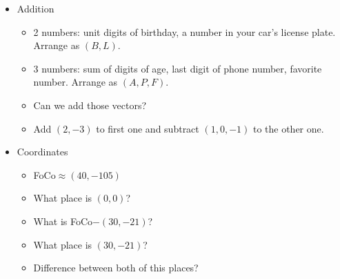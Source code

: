 \documentclass{standalone}
\begin{document}
\begin{itemize}
  \item Addition
  \begin{itemize}
    \item 2 numbers: unit digits of birthday, a number in your car's license plate. Arrange as $(B,L)$.
    \item 3 numbers: sum of digits of age, last digit of phone number, favorite number. Arrange as $(A,P,F)$.
    \item Can we add those vectors?
    \item Add $(2,-3)$ to first one and subtract $(1,0,-1)$ to the other one.
  \end{itemize}
  \item Coordinates
  \begin{itemize}
    \item FoCo$\approx(40,-105)$
    \item What place is $(0,0)$?
    \item What is FoCo$-(30,-21)$?
    \item What place is $(30,-21)$?
    \item Difference between both of this places?
  \end{itemize}
\end{itemize}
\end{document}
